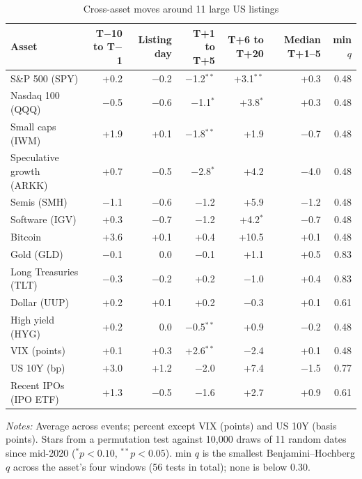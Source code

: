 \begin{table}[!htbp]\centering\footnotesize
\caption{Cross-asset moves around 11 large US listings}\label{tab:xasset}

\begin{threeparttable}
\begin{tabular}{lrrrrrr}
\toprule
Asset & T$-$10 to T$-$1 & Listing day & T+1 to T+5 & T+6 to T+20 & Median T+1--5 & min $q$ \\
\midrule
S\&P 500 (SPY) & +0.2 & $-$0.2 & $-$1.2$^{**}$ & +3.1$^{**}$ & +0.3 & 0.48 \\
Nasdaq 100 (QQQ) & $-$0.5 & $-$0.6 & $-$1.1$^{*}$ & +3.8$^{*}$ & +0.3 & 0.48 \\
Small caps (IWM) & +1.9 & +0.1 & $-$1.8$^{**}$ & +1.9 & $-$0.7 & 0.48 \\
Speculative growth (ARKK) & +0.7 & $-$0.5 & $-$2.8$^{*}$ & +4.2 & $-$4.0 & 0.48 \\
Semis (SMH) & $-$1.1 & $-$0.6 & $-$1.2 & +5.9 & $-$1.2 & 0.48 \\
Software (IGV) & +0.3 & $-$0.7 & $-$1.2 & +4.2$^{*}$ & $-$0.7 & 0.48 \\
Bitcoin & +3.6 & +0.1 & +0.4 & +10.5 & +0.1 & 0.48 \\
Gold (GLD) & $-$0.1 & 0.0 & $-$0.1 & +1.1 & +0.5 & 0.83 \\
Long Treasuries (TLT) & $-$0.3 & $-$0.2 & +0.2 & $-$1.0 & +0.4 & 0.83 \\
Dollar (UUP) & +0.2 & +0.1 & +0.2 & $-$0.3 & +0.1 & 0.61 \\
High yield (HYG) & +0.2 & 0.0 & $-$0.5$^{**}$ & +0.9 & $-$0.2 & 0.48 \\
VIX (points) & +0.1 & +0.3 & +2.6$^{**}$ & $-$2.4 & +0.1 & 0.48 \\
US 10Y (bp) & +3.0 & +1.2 & $-$2.0 & +7.4 & $-$1.5 & 0.77 \\
Recent IPOs (IPO ETF) & +1.3 & $-$0.5 & $-$1.6 & +2.7 & +0.9 & 0.61 \\
\bottomrule
\end{tabular}
\begin{tablenotes}[flushleft]\footnotesize
\item \textit{Notes:} Average across events; percent except VIX (points) and US 10Y (basis points). Stars from a permutation test against 10,000 draws of 11 random dates since mid-2020 ($^{*}p<0.10$, $^{**}p<0.05$). min $q$ is the smallest Benjamini--Hochberg $q$ across the asset's four windows (56 tests in total); none is below 0.30.
\end{tablenotes}
\end{threeparttable}

\end{table}

